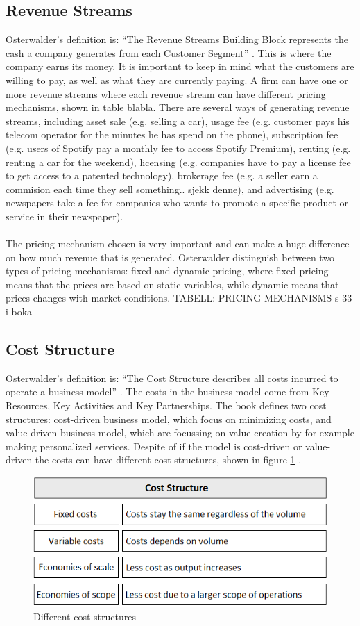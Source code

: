 \subsection{Revenue Streams}
Osterwalder’s definition is: “The Revenue Streams Building Block represents the cash a company generates from each Customer Segment” \cite{osterwalder}. This is where the company earns its money. It is important to keep in mind what the customers are willing to pay, as well as what they are currently paying. A firm can have one or more revenue streams where each revenue stream can have different pricing mechanisms, shown in table blabla. There are several ways of generating revenue streams, including asset sale (e.g. selling a car), usage fee (e.g. customer pays his telecom operator for the minutes he has spend on the phone), subscription fee (e.g. users of Spotify pay a monthly fee to access Spotify Premium), renting (e.g. renting a car for the weekend), licensing (e.g. companies have to pay a license fee to get access to a patented technology), brokerage fee (e.g. a seller earn a commision each time they sell something.. sjekk denne), and advertising (e.g. newspapers take a fee for companies who wants to promote a specific product or service in their newspaper). \\ \\ 
The pricing mechanism chosen is very important and can make a huge difference on how much revenue that is generated. Osterwalder distinguish between two types of pricing mechanisms: fixed and dynamic pricing, where fixed pricing means that the prices are based on static variables, while dynamic means that prices changes with market conditions. \cite{osterwalder}
TABELL: PRICING MECHANISMS s 33 i boka

\subsection{Cost Structure}
Osterwalder’s definition is: “The Cost Structure describes all costs incurred to operate a business model” \cite{osterwalder}. The costs in the business model come from Key Resources, Key Activities and Key Partnerships. The book \cite{osterwalder} defines two cost structures: cost-driven business model, which focus on minimizing costs, and value-driven business model, which are focussing on value creation by for example making personalized services. Despite of if the model is cost-driven or value-driven the costs can have different cost structures, shown in figure \ref{fig:CostStructure} \cite{osterwalder}.

\begin{figure}[h]
\caption[CostStructure]{Different cost structures}
\label{fig:CostStructure}
\begin{center}
\includegraphics[scale=0.8]{coststructure}
\end{center}
\end{figure}

